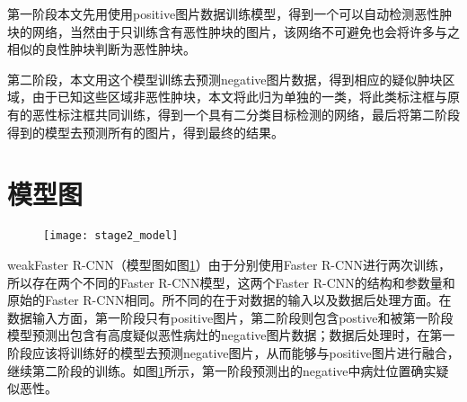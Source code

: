 第一阶段本文先用使用positive图片数据训练模型，得到一个可以自动检测恶性肿块的网络，当然由于只训练含有恶性肿块的图片，该网络不可避免也会将许多与之相似的良性肿块判断为恶性肿块。

第二阶段，本文用这个模型训练去预测negative图片数据，得到相应的疑似肿块区域，由于已知这些区域非恶性肿块，本文将此归为单独的一类，将此类标注框与原有的恶性标注框共同训练，得到一个具有二分类目标检测的网络，最后将第二阶段得到的模型去预测所有的图片，得到最终的结果。

\section{模型图}
\begin{figure}[!htbp]
    \centering
    \texttt{[image: stage2\_model]}
    \label{fig:stage2_model}
\end{figure}
weakFaster R-CNN（模型图如图\ref{fig:stage2_model}）由于分别使用Faster R-CNN进行两次训练，所以存在两个不同的Faster R-CNN模型，这两个Faster R-CNN的结构和参数量和原始的Faster R-CNN相同。所不同的在于对数据的输入以及数据后处理方面。在数据输入方面，第一阶段只有positive图片，第二阶段则包含postive和被第一阶段模型预测出包含有高度疑似恶性病灶的negative图片数据；数据后处理时，在第一阶段应该将训练好的模型去预测negative图片，从而能够与positive图片进行融合，继续第二阶段的训练。如图\ref{fig:stage2_model}所示，第一阶段预测出的negative中病灶位置确实疑似恶性。
